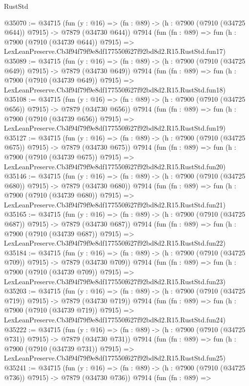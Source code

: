 \begin{lexlean}{RustStd}
\begin{coremodule}
@35070 := @34715
    (fun (y : @16) => (fn : @89) -> (h : @7900 (@7910 (@34725 @644)) @7915) -> @7879 (@34730 @644))
    @7914
    (fun (fn : @89) =>
    fun (h : @7900 (@7910 (@34739 @644)) @7915) =>
    LexLeanPreserve.Cb3f94f79f9e8df177550f627f92bd8d2.R15.RustStd.fun17)
@35089 := @34715
    (fun (y : @16) => (fn : @89) -> (h : @7900 (@7910 (@34725 @649)) @7915) -> @7879 (@34730 @649))
    @7914
    (fun (fn : @89) =>
    fun (h : @7900 (@7910 (@34739 @649)) @7915) =>
    LexLeanPreserve.Cb3f94f79f9e8df177550f627f92bd8d2.R15.RustStd.fun18)
@35108 := @34715
    (fun (y : @16) => (fn : @89) -> (h : @7900 (@7910 (@34725 @656)) @7915) -> @7879 (@34730 @656))
    @7914
    (fun (fn : @89) =>
    fun (h : @7900 (@7910 (@34739 @656)) @7915) =>
    LexLeanPreserve.Cb3f94f79f9e8df177550f627f92bd8d2.R15.RustStd.fun19)
@35127 := @34715
    (fun (y : @16) => (fn : @89) -> (h : @7900 (@7910 (@34725 @675)) @7915) -> @7879 (@34730 @675))
    @7914
    (fun (fn : @89) =>
    fun (h : @7900 (@7910 (@34739 @675)) @7915) =>
    LexLeanPreserve.Cb3f94f79f9e8df177550f627f92bd8d2.R15.RustStd.fun20)
@35146 := @34715
    (fun (y : @16) => (fn : @89) -> (h : @7900 (@7910 (@34725 @680)) @7915) -> @7879 (@34730 @680))
    @7914
    (fun (fn : @89) =>
    fun (h : @7900 (@7910 (@34739 @680)) @7915) =>
    LexLeanPreserve.Cb3f94f79f9e8df177550f627f92bd8d2.R15.RustStd.fun21)
@35165 := @34715
    (fun (y : @16) => (fn : @89) -> (h : @7900 (@7910 (@34725 @687)) @7915) -> @7879 (@34730 @687))
    @7914
    (fun (fn : @89) =>
    fun (h : @7900 (@7910 (@34739 @687)) @7915) =>
    LexLeanPreserve.Cb3f94f79f9e8df177550f627f92bd8d2.R15.RustStd.fun22)
@35184 := @34715
    (fun (y : @16) => (fn : @89) -> (h : @7900 (@7910 (@34725 @709)) @7915) -> @7879 (@34730 @709))
    @7914
    (fun (fn : @89) =>
    fun (h : @7900 (@7910 (@34739 @709)) @7915) =>
    LexLeanPreserve.Cb3f94f79f9e8df177550f627f92bd8d2.R15.RustStd.fun23)
@35203 := @34715
    (fun (y : @16) => (fn : @89) -> (h : @7900 (@7910 (@34725 @719)) @7915) -> @7879 (@34730 @719))
    @7914
    (fun (fn : @89) =>
    fun (h : @7900 (@7910 (@34739 @719)) @7915) =>
    LexLeanPreserve.Cb3f94f79f9e8df177550f627f92bd8d2.R15.RustStd.fun24)
@35222 := @34715
    (fun (y : @16) => (fn : @89) -> (h : @7900 (@7910 (@34725 @731)) @7915) -> @7879 (@34730 @731))
    @7914
    (fun (fn : @89) =>
    fun (h : @7900 (@7910 (@34739 @731)) @7915) =>
    LexLeanPreserve.Cb3f94f79f9e8df177550f627f92bd8d2.R15.RustStd.fun25)
@35241 := @34715
    (fun (y : @16) => (fn : @89) -> (h : @7900 (@7910 (@34725 @736)) @7915) -> @7879 (@34730 @736))
    @7914
    (fun (fn : @89) =>

\end{coremodule}
\end{lexlean}

